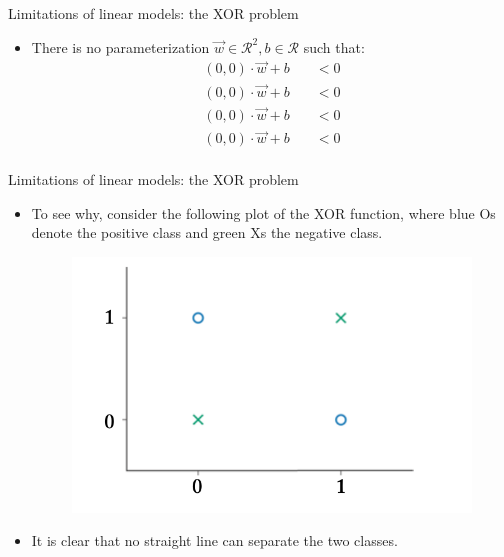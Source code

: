 \documentclass[handout]{beamer}
\begin{document}
\begin{frame}{Limitations of linear models: the XOR problem}
\begin{scriptsize}
\begin{itemize}
\item There is no parameterization $\vec{w} \in \mathcal{R}^2, b \in \mathcal{R}$ such that:
\begin{equation}
 \begin{split}
  (0,0) \cdot \vec{w} +b \quad & < 0 \\
  (0,0) \cdot \vec{w} +b \quad & < 0 \\
  (0,0) \cdot \vec{w} +b \quad & < 0 \\
  (0,0) \cdot \vec{w} +b \quad & < 0 \\
 \end{split}
\end{equation}
\end{itemize}
\end{scriptsize}
\end{frame}



\begin{frame}{Limitations of linear models: the XOR problem}
\begin{scriptsize}
\begin{itemize}
\item To see why, consider the following plot of the XOR function, where blue Os denote the positive class and green Xs the negative class.
\begin{figure}[htb]
	\centering
	 \includegraphics[scale=0.35]{pics/xor.png}
\end{figure}
\item It is clear that no straight line can separate the two classes.
\end{itemize}
\end{scriptsize}
\end{frame}
\end{document}
